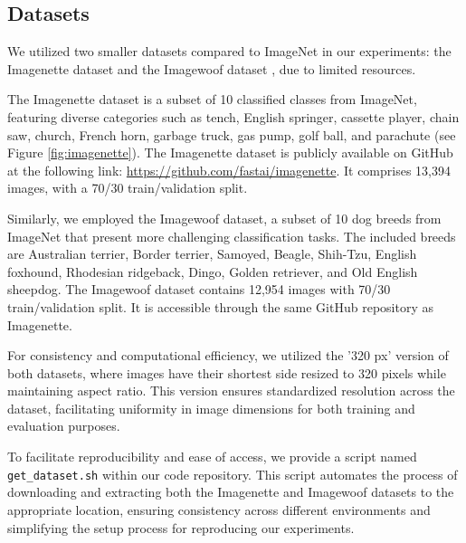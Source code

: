 \documentclass[sigconf, nonacm]{acmart}
\begin{document}
\subsection{Datasets}

We utilized two smaller datasets compared to ImageNet \cite{imagenet} in our experiments: the Imagenette dataset and the Imagewoof dataset \cite{imagenette}, due to limited resources.

The Imagenette dataset is a subset of 10 classified classes from ImageNet, featuring diverse categories such as tench, English springer, cassette player, chain saw, church, French horn, garbage truck, gas pump, golf ball, and parachute (see Figure \ref{fig:imagenette}). The Imagenette dataset is publicly available on GitHub at the following link: \url{https://github.com/fastai/imagenette}. It comprises 13,394 images, with a 70/30 train/validation split.

Similarly, we employed the Imagewoof dataset, a subset of 10 dog breeds from ImageNet that present more challenging classification tasks. The included breeds are Australian terrier, Border terrier, Samoyed, Beagle, Shih-Tzu, English foxhound, Rhodesian ridgeback, Dingo, Golden retriever, and Old English sheepdog. The Imagewoof dataset contains 12,954 images with 70/30 train/validation split. It is accessible through the same GitHub repository as Imagenette.

For consistency and computational efficiency, we utilized the '320 px' version of both datasets, where images have their shortest side resized to 320 pixels while maintaining aspect ratio. This version ensures standardized resolution across the dataset, facilitating uniformity in image dimensions for both training and evaluation purposes.

To facilitate reproducibility and ease of access, we provide a script named \texttt{get\_dataset.sh} within our code repository. This script automates the process of downloading and extracting both the Imagenette and Imagewoof datasets to the appropriate location, ensuring consistency across different environments and simplifying the setup process for reproducing our experiments.
\end{document}
